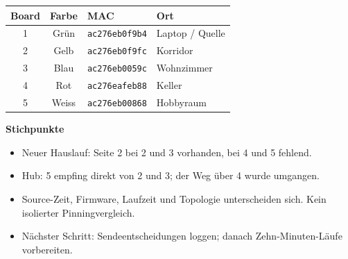 \documentclass[a4paper,11pt]{article}
\begin{document}
\begin{center}\small\begin{tabular}{ccll}\toprule
Board & Farbe & MAC & Ort \\ \midrule
1 & Grün & \texttt{ac276eb0f9b4} & Laptop / Quelle \\
2 & Gelb & \texttt{ac276eb0f9fc} & Korridor \\
3 & Blau & \texttt{ac276eb0059c} & Wohnzimmer \\
4 & Rot & \texttt{ac276eafeb88} & Keller \\
5 & Weiss & \texttt{ac276eb00868} & Hobbyraum \\
\bottomrule\end{tabular}\end{center}

\textbf{Stichpunkte}

\begin{itemize}

\item Neuer Hauslauf: Seite 2 bei 2 und 3 vorhanden, bei 4 und 5 fehlend.

\item Hub: 5 empfing direkt von 2 und 3; der Weg über 4 wurde umgangen.

\item Source-Zeit, Firmware, Laufzeit und Topologie unterscheiden sich. Kein isolierter Pinningvergleich.

\item Nächster Schritt: Sendeentscheidungen loggen; danach Zehn-Minuten-Läufe vorbereiten.

\end{itemize}
\end{document}
